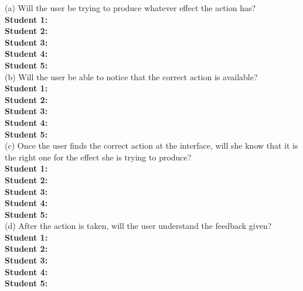 \documentclass[pdftex,12pt,a4paper]{report}
\begin{document}
(a) Will the user be trying to produce whatever effect the action has?
\\\indent \textbf{Student 1:} 
\\\indent \textbf{Student 2:} 
\\\indent \textbf{Student 3:} 
\\\indent \textbf{Student 4:} 
\\\indent \textbf{Student 5:} 
\\(b) Will the user be able to notice that the correct action is available?
\\\indent \textbf{Student 1:} 
\\\indent \textbf{Student 2:} 
\\\indent \textbf{Student 3:} 
\\\indent \textbf{Student 4:} 
\\\indent \textbf{Student 5:} 
\\(c) Once the user finds the correct action at the interface, will she know that it is the right one for the effect she is trying to produce?
\\\indent \textbf{Student 1:} 
\\\indent \textbf{Student 2:} 
\\\indent \textbf{Student 3:} 
\\\indent \textbf{Student 4:} 
\\\indent \textbf{Student 5:} 
\\(d) After the action is taken, will the user understand the feedback given?
\\\indent \textbf{Student 1:} 
\\\indent \textbf{Student 2:} 
\\\indent \textbf{Student 3:} 
\\\indent \textbf{Student 4:} 
\\\indent \textbf{Student 5:} 
\end{document}
